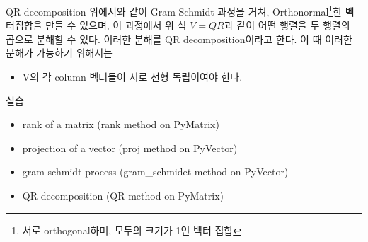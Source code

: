 \documentclass{beamer}
\begin{document}
\begin{frame}{QR decomposition} 
위에서와 같이 Gram-Schmidt 과정을 거쳐, Orthonormal\footnote{서로 orthogonal하며, 모두의 크기가 1인 벡터 집합}한 벡터집합을 만들 수 있으며, 이 과정에서 위 식 $V=QR$과 같이 어떤 행렬을 두 행렬의 곱으로 분해할 수 있다. 이러한 분해를 QR decomposition이라고 한다. 이 때 이러한 분해가 가능하기 위해서는 

\begin{itemize} 
\item V의 각 column 벡터들이 서로 선형 독립이여야 한다. 
\end{itemize}
\end{frame}

\begin{frame}{실습} 
\begin{itemize} 
\item rank of a matrix (rank method on PyMatrix)
\item projection of a vector (proj method on PyVector)
\item gram-schmidt process (gram_schmidet method on PyVector)
\item QR decomposition (QR method on PyMatrix)
\end{itemize}
\end{frame}








\end{document}
